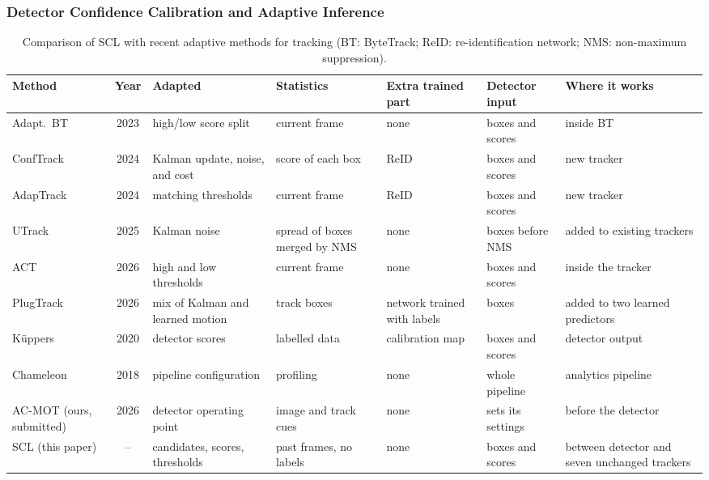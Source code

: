 \documentclass[pdflatex,sn-mathphys-num,iicol]{sn-jnl}
\newcommand{\scl}{SCL}
\begin{document}
\subsubsection{Detector Confidence Calibration and Adaptive Inference}
\begin{table}[t]
\caption{Comparison of \scl{} with recent adaptive methods for tracking (BT: ByteTrack; ReID: re-identification network; NMS: non-maximum suppression).}
\label{tab:related}
\centering\footnotesize
\setlength{\tabcolsep}{3pt}
\begin{tabular}{@{}>{\raggedright\arraybackslash}p{18mm}c>{\raggedright\arraybackslash}p{21mm}>{\raggedright\arraybackslash}p{19mm}>{\raggedright\arraybackslash}p{15mm}>{\raggedright\arraybackslash}p{16mm}>{\raggedright\arraybackslash}p{21mm}@{}}
\toprule
Method & Year & Adapted & Statistics & Extra trained part & Detector input & Where it works\\
\midrule
Adapt.\ BT \cite{ma2023adaptivebytetrack} & 2023 & high/low score split & current frame & none & boxes and scores & inside BT\\
ConfTrack \cite{jung2024conftrack} & 2024 & Kalman update, noise, and cost & score of each box & ReID & boxes and scores & new tracker\\
AdapTrack \cite{shim2024adaptrack} & 2024 & matching thresholds & current frame & ReID & boxes and scores & new tracker\\
UTrack \cite{solano2025utrack} & 2025 & Kalman noise & spread of boxes merged by NMS & none & boxes before NMS & added to existing trackers\\
ACT \cite{act2026adaptive} & 2026 & high and low thresholds & current frame & none & boxes and scores & inside the tracker\\
PlugTrack \cite{kim2026plugtrack} & 2026 & mix of Kalman and learned motion & track boxes & network trained with labels & boxes & added to two learned predictors\\
K{\"u}ppers \cite{kuppers2020detcalib} & 2020 & detector scores & labelled data & calibration map & boxes and scores & detector output\\
Chameleon \cite{jiang2018chameleon} & 2018 & pipeline configuration & profiling & none & whole pipeline & analytics pipeline\\
AC-MOT (ours, submitted) & 2026 & detector operating point & image and track cues & none & sets its settings & before the detector\\
\scl{} (this paper) & -- & candidates, scores, thresholds & past frames, no labels & none & boxes and scores & between detector and seven unchanged trackers\\
\bottomrule
\end{tabular}
\end{table}
\end{document}

